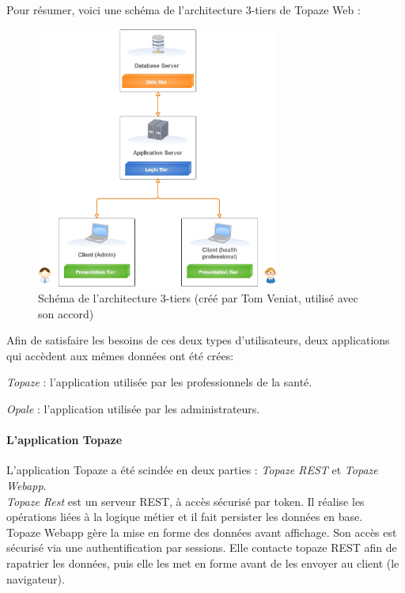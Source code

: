 Pour résumer, voici une schéma de l'architecture 3-tiers de Topaze Web :
\begin{figure}[H]
  \centering
  \includegraphics[width=8cm]{./img/architecture1}
  \caption{\label{fig:mb_va_ast} Schéma de l'architecture 3-tiers (créé par Tom Veniat, utilisé avec son accord)}
\end{figure}

Afin de satisfaire les besoins de ces deux types d'utilisateurs, deux applications qui accèdent aux mêmes données ont été crées: 

\begin{sitemize}
\item \textit{Topaze} : l'application utilisée par les professionnels de la santé. 
\item \textit{Opale} : l'application utilisée par les administrateurs.
\end{sitemize}

\paragraph*{L'application Topaze\\}
L'application Topaze a été scindée en deux parties : \textit{Topaze REST} et \textit{Topaze Webapp}.\\
\textit{Topaze Rest} est un serveur REST, à accès sécurisé par token. Il réalise les opérations liées à la logique métier et il fait persister les données en base.\\
Topaze Webapp gère la mise en forme des données avant affichage. Son accès est sécurisé via une authentification par sessions. Elle contacte topaze REST afin de rapatrier les données, puis elle les met en forme avant de les envoyer au client (le navigateur).

